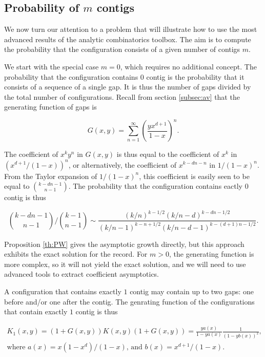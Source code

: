 \documentclass{article}
\begin{document}
\subsection{Probability of $m$ contigs}
\label{subsec:probmcontigs}

We now turn our attention to a problem that will illustrate how to use the
most advanced results of the analytic combinatorics toolbox. The aim
is to compute the probability that the configuration consists of a
given number of contigs $m$.

We start with the special case $m = 0$, which requires no additional
concept. The probability that the configuration contains $0$ contig is the
probability that it consists of a sequence of a single gap. It is thus the
number of gaps divided by the total number of configurations. Recall from
section \ref{subsec:av} that the generating function of gaps is

\begin{equation*}
G(x,y) = \sum_{n=1}^\infty \left( \frac{yx^{d+1}}{1-x} \right )^n.
\end{equation*}

The coefficient of $x^ky^n$ in $G(x,y)$ is thus equal to the coefficient
of $x^k$ in $\left(x^{d+1}/(1-x)\right)^n$, or alternatively, the
coefficient of $x^{k-dn-n}$ in $1/(1-x)^n$. From the Taylor expansion of
$1/(1-x)^n$, this coefficient is easily seen to be equal to ${k-dn-1
\choose n-1}$. The probability that the configuration contains eactly $0$
contig is thus

\begin{equation}
\label{eq:m=0}
{k-dn-1 \choose n-1} \Big/ {k-1 \choose n-1} \sim 
\frac{(k/n)^{k-1/2}(k/n-d)^{k-dn-1/2}}
 {(k/n-1)^{k-n+1/2}(k/n-d-1)^{k-(d+1)n-1/2}}.
\end{equation}

Proposition \ref{th:PW} gives the asymptotic growth directly, but this
approach exhibits the exact solution for the record. For $m > 0$, the
generating function is more complex, so it will not yield the exact
solution, and we will need to use advanced tools to extract coefficient
asymptotics.

A configuration that contains exactly $1$ contig may contain up to two
gaps: one before and/or one after the contig. The genrating function of
the configurations that contain exactly $1$ contig is thus

\begin{equation*}
\begin{split}
K_1(x,y) = (1+G(x,y))K(x,y)(1+G(x,y)) =
\frac{ya(x)}{1-ya(x)}
\frac{1}{\left(1-yb(x)\right)^2}, \\
\text{where $a(x) = x(1-x^d)/(1-x)$, and $b(x) = x^{d+1}/(1-x)$}.
\end{split}
\end{equation*}
\end{document}
